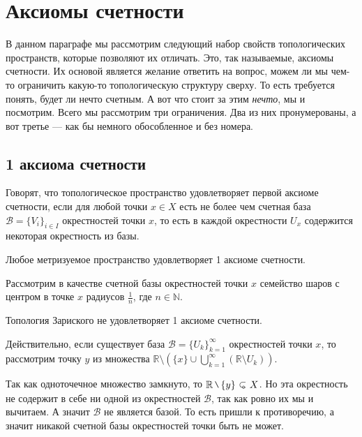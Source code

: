 \section{Аксиомы счетности}
\begin{Intro}
    В данном параграфе мы рассмотрим следующий набор свойств топологических пространств, которые позволяют их отличать. Это, так называемые, аксиомы счетности. Их основой является желание ответить на вопрос, можем ли мы чем-то ограничить какую-то топологическую структуру сверху. То есть требуется понять, будет ли нечто счетным. А вот что стоит за этим \textit{нечто}, мы и посмотрим. Всего мы рассмотрим три ограничения. Два из них пронумерованы, а вот третье --- как бы немного обособленное и без номера.
\end{Intro}
\subsection{1 аксиома счетности}
\begin{Def}
    Говорят, что топологическое пространство \topX удовлетворяет первой аксиоме счетности, если для любой точки $x\in X$ есть не более чем счетная база $\mathcal{B} = \{ V_i \}_{i\in I}$ окрестностей точки  $x$, то есть в каждой окрестности $U_x$ содержится некоторая окрестность из базы. 
\end{Def}

\begin{Prop}
    Любое метризуемое пространство удовлетворяет 1 аксиоме счетности.
\end{Prop}
\begin{Proof}
    Рассмотрим в качестве счетной базы окрестностей точки $x$ семейство шаров с центром в точке $x$ радиусов $\frac{1}{n}$, где $ n\in \mathbb{N}$. 
\end{Proof}

\begin{Ex}
    Топология Зариского не удовлетворяет 1 аксиоме счетности.

    Действительно, если существует база $\mathcal{B} = \{ U_k \}_{k=1}^\infty$ окрестностей точки $x$, то рассмотрим точку $y$ из множества $\mathbb{R} \setminus \left( \{x\} \cup \bigcup\limits_{k=1}^{\infty} (\mathbb{R} \setminus U_k) \right)$. 

    Так как одноточечное множество замкнуто, то $\mathbb{R} \setminus \{y\} \open X$. Но эта окрестность не содержит в себе ни одной из окрестностей $\mathcal{B}$, так как ровно их мы и вычитаем. А значит $\mathcal{B}$ не является базой. То есть пришли к противоречию, а значит никакой счетной базы окрестностей точки быть не может.
\end{Ex}

